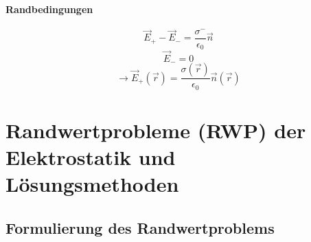 \paragraph{Randbedingungen}
%
%
%
%
%
%
$$\vec{E}_+ - \vec{E}_- = \frac{\sigma^-}{\epsilon_0} \vec{n}$$
$$\vec{E}_- = 0$$
$$\rightarrow \vec{E}_+(\vec{r}) = \frac{\sigma(\vec{r})}{\epsilon_0} \vec{n} {(\vec{r})}$$



\section{Randwertprobleme (RWP) der Elektrostatik und \texorpdfstring{\\}{newline} Lösungsmethoden}

\subsection{Formulierung des Randwertproblems}

